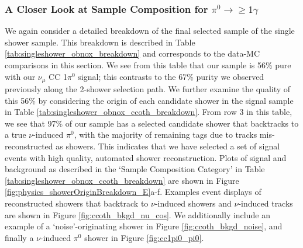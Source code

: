 \subsubsection{A Closer Look at Sample Composition for $\pi^0\rightarrow\geq 1 \gamma$} 
We again consider a detailed breakdown of the final selected sample of the single shower sample.  This breakdown is described in Table \ref{tab:singleshower_obnox_breakdown} and corresponds to the data-MC comparisons in this section. We see from this table that our sample is 56\% pure with our $\nu_\mu$ CC 1$\pi^0$ signal; this contrasts to the 67\% purity we observed previously along the 2-shower selection path.  We further examine the quality of this 56\% by considering the origin of each candidate shower in the signal sample in Table \ref{tab:singleshower_obnox_ccoth_breakdown}.  From row 3 in this table, we see that 97\% of our sample has a selected candidate shower that backtracks to a true $\nu$-induced $\pi^0$, with the majority of remaining tags due to tracks mis-reconstructed as showers. This indicates that we have selected a set of signal events with high quality, automated shower reconstruction.  Plots of signal and background as described in the `Sample Composition Category' in Table \ref{tab:singleshower_obnox_ccoth_breakdown} are shown in Figure \ref{fig:physics_showerOriginBreakdown_E}a-f. Examples event displays of reconstructed showers that backtrack to $\nu$-induced showers and $\nu$-induced tracks are shown in Figure \ref{fig:ccoth_bkgd_nu_cos}.  We additionally include an example of a `noise'-originating shower in Figure \ref{fig:ccoth_bkgd_noise}, and finally a $\nu$-induced $\pi^0$ shower in Figure \ref{fig:cc1pi0_pi0}.
\clearpage
